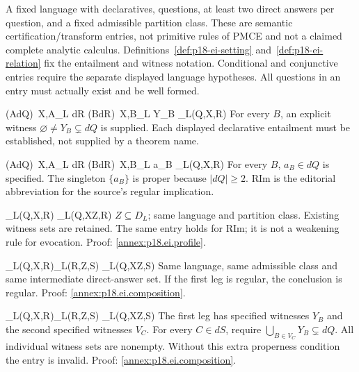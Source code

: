   {A fixed language with declaratives, questions, at least two direct answers
  per question, and a fixed admissible partition class. These are semantic
  certification/transform entries, not primitive rules of PMCE and not a
  claimed complete analytic calculus. Definitions~\ref{def:p18-ei-setting}
  and~\ref{def:p18-ei-relation} fix the entailment and witness notation.
  Conditional and conjunctive entries require the separate displayed language
  hypotheses. All questions in an entry must actually exist and be well formed.}

  {(\forall A\in dQ)\ X,A\mathrel{\|=}_L dR\qquad
   (\forall B\in dR)\ X,B\mathrel{\|=}_L Y_B}
  {_L(Q,X,R)}
  {For every \(B\), an explicit witness
   \(\varnothing\ne Y_B\subsetneq dQ\) is supplied. Each displayed
   declarative entailment must be established, not supplied by a theorem name.}

  {(\forall A\in dQ)\ X,A\mathrel{\|=}_L dR\qquad
   (\forall B\in dR)\ X,B\models_L a_B}
  {_L(Q,X,R)}
  {For every \(B\), \(a_B\in dQ\) is specified. The singleton
   \(\{a_B\}\) is proper because \(|dQ|\geq2\). RIm is the
   editorial abbreviation for the source's regular implication.}

  {_L(Q,X,R)}
  {_L(Q,X\cup Z,R)}
  {\(Z\subseteq D_L\); same language and partition class.
   Existing witness sets are retained. The same entry holds for RIm;
   it is not a weakening rule for evocation. Proof: \ref{annex:p18.ei.profile}.}

  {_L(Q,X,R)\qquad{}_L(R,Z,S)}
  {_L(Q,X\cup Z,S)}
  {Same language, same admissible class and same intermediate direct-answer
   set. If the first leg is regular, the conclusion is regular.
   Proof: \ref{annex:p18.ei.composition}.}

  {_L(Q,X,R)\qquad{}_L(R,Z,S)}
  {_L(Q,X\cup Z,S)}
  {The first leg has specified witnesses \(Y_B\) and the second
   specified witnesses \(V_C\). For every \(C\in dS\), require
   \(\bigcup_{B\in V_C}Y_B\subsetneq dQ\).
   All individual witness sets are nonempty. Without this extra properness
   condition the entry is invalid. Proof: \ref{annex:p18.ei.composition}.}

